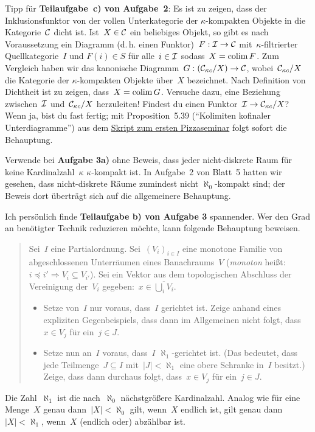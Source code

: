 \documentclass{uebblatt}
\begin{document}
Tipp für \textbf{Teilaufgabe~c) von Aufgabe~2}: Es ist zu zeigen, dass der
Inklusionsfunktor von der vollen Unterkategorie der $\kappa$-kompakten Objekte
in die Kategorie~$\mathcal{C}$ dicht ist. Ist~$X \in \mathcal{C}$ ein beliebiges Objekt, so gibt
es nach Voraussetzung ein Diagramm (d.\,h. einen Funktor)~$F : \mathcal{I} \to \mathcal{C}$
mit~$\kappa$-filtrierter Quellkategorie~$I$ und $F(i) \in S$ für alle~$i \in \mathcal{I}$
sodass~$X = \operatorname*{colim} F$. Zum Vergleich haben wir das kanonische Diagramm~$G :
(\mathcal{C}_{\kappa c}/X) \to \mathcal{C}$, wobei~$\mathcal{C}_{\kappa c}/X$ die Kategorie der
$\kappa$-kompakten Objekte über~$X$ bezeichnet. Nach Definition von Dichtheit
ist zu zeigen, dass~$X = \operatorname*{colim} G$. Versuche dazu, eine Beziehung zwischen~$\mathcal{I}$
und~$\mathcal{C}_{\kappa c}/X$ herzuleiten! Findest du einen Funktor~$\mathcal{I} \to \mathcal{C}_{\kappa
c}/X$? Wenn ja, bist du fast fertig; mit Proposition~5.39 ("`Kolimiten
kofinaler Unterdiagramme"') aus dem
\href{http://pizzaseminar.speicherleck.de/skript1/pizzaseminar.pdf}{Skript zum
ersten Pizzaseminar} folgt sofort die Behauptung.

Verwende bei \textbf{Aufgabe 3a)} ohne Beweis, dass jeder nicht-diskrete Raum für keine
Kardinalzahl~$\kappa$ $\kappa$-kompakt ist. In Aufgabe~2 von Blatt~5 hatten wir
gesehen, dass nicht-diskrete Räume zumindest nicht $\aleph_0$-kompakt sind; der
Beweis dort überträgt sich auf die allgemeinere Behauptung.

Ich persönlich finde \textbf{Teilaufgabe b) von Aufgabe 3} spannender.
Wer den Grad an benötigter Technik reduzieren möchte, kann folgende Behauptung
beweisen.
\begin{quote}
Sei~$I$ eine Partialordnung.
Sei~$(V_i)_{i \in I}$ eine monotone Familie von abgeschlossenen Unterräumen
eines Banachraums~$V$ (\emph{monoton} heißt: $i \preceq i' \Rightarrow
V_i \subseteq V_{i'}$).
Sei ein Vektor aus dem topologischen Abschluss der Vereinigung der~$V_i$
gegeben:~$x \in \overline{\bigcup_i V_i}$.
\begin{itemize}
\item Setze von~$I$ nur voraus, dass~$I$ gerichtet ist.
Zeige anhand eines expliziten Gegenbeispiels, dass dann im Allgemeinen nicht
folgt, dass~$x \in V_j$ für ein~$j \in J$.
\item Setze nun an~$I$ voraus, dass~$I$ $\aleph_1$-gerichtet ist. (Das
bedeutet, dass jede Teilmenge~$J \subseteq I$ mit~$|J| < \aleph_1$ eine obere
Schranke in~$I$ besitzt.) Zeige, dass dann durchaus folgt, dass~$x \in V_j$ für
ein~$j \in J$.
\end{itemize}
\end{quote}
Die Zahl~$\aleph_1$ ist die nach~$\aleph_0$ nächstgrößere Kardinalzahl. Analog
wie für eine Menge~$X$ genau dann~$|X| < \aleph_0$ gilt, wenn~$X$ endlich ist,
gilt genau dann~$|X| < \aleph_1$, wenn~$X$ (endlich oder) abzählbar ist.
\end{document}

